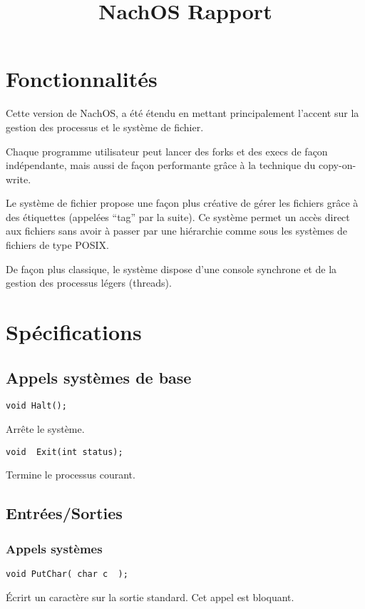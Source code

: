 \documentclass{report}
\title{NachOS Rapport}
\author{
}
\begin{document}
\maketitle

\tableofcontents
\chapter{Fonctionnalités}

Cette version de NachOS, a été étendu en mettant principalement l'accent sur la gestion des processus et le système de fichier.

Chaque programme utilisateur peut lancer des forks et des execs de façon indépendante, mais aussi de façon performante grâce à la technique du copy-on-write.

Le système de fichier propose une façon plus créative de gérer les fichiers grâce à des étiquettes (appelées ``tag'' par la suite). Ce système permet un accès direct aux fichiers sans avoir à passer par une hiérarchie comme sous les systèmes de fichiers de type POSIX.

De façon plus classique, le système dispose d'une console synchrone et de la gestion des processus légers (threads).

\chapter{Spécifications}

\section{Appels systèmes de base}

\begin{verbatim}
void Halt();
\end{verbatim}
Arrête le système.

\begin{verbatim}
void  Exit(int status);
\end{verbatim}
Termine le processus courant.
\section{Entrées/Sorties}

\subsection{Appels systèmes}

\begin{verbatim}
void PutChar( char c  );
\end{verbatim}
Écrirt un caractère sur la sortie standard. Cet appel est bloquant.
\end{document}
